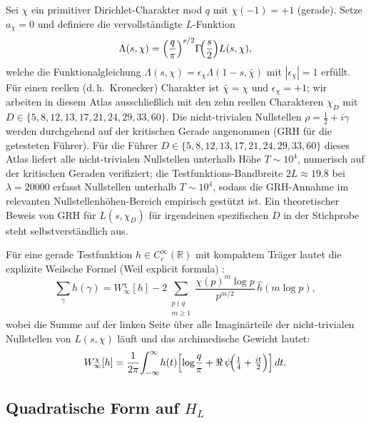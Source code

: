 \documentclass[10pt,twocolumn]{article}
\theoremstyle{definition}
\theoremstyle{remark}
\newcommand{\chifn}{\chi}
\newcommand{\halfline}{\tfrac{1}{2}}
\begin{document}
Sei $\chifn$ ein primitiver Dirichlet-Charakter mod $q$ mit
$\chifn(-1)=+1$ (gerade). Setze $a_{\chifn}=0$ und definiere die vervollständigte
$L$-Funktion
\[
  \Lambda(s,\chifn)
    =\Bigl(\frac{q}{\pi}\Bigr)^{s/2}\Gamma\!\Bigl(\frac{s}{2}\Bigr)
      L(s,\chifn),
\]
welche die Funktionalgleichung
$\Lambda(s,\chifn)=\epsilon_{\chifn}\Lambda(1-s,\bar\chifn)$ mit
$|\epsilon_{\chifn}|=1$ erfüllt. Für einen reellen (d.\,h.\ Kronecker) Charakter
ist $\bar\chifn=\chifn$ und $\epsilon_{\chifn}=+1$; wir arbeiten in diesem Atlas ausschließlich
mit den zehn reellen Charakteren $\chifn_D$ mit $D\in\{5,8,12,13,17,21,
24,29,33,60\}$. Die nicht-trivialen Nullstellen
$\rho=\halfline+i\gamma$ werden durchgehend auf der kritischen Gerade angenommen
(GRH für die getesteten Führer). Für die Führer
$D\in\{5,8,12,13,17,21,24,29,33,60\}$ dieses Atlas liefert
\cite{LMFDB} alle nicht-trivialen Nullstellen unterhalb Höhe
$T\sim 10^4$, numerisch auf der kritischen Geraden verifiziert; die
Testfunktions-Bandbreite $2L\approx 19.8$ bei $\lambda=20000$ erfasst
Nullstellen unterhalb $T\sim 10^4$, sodass die GRH-Annahme im
relevanten Nullstellenhöhen-Bereich empirisch gestützt ist. Ein
theoretischer Beweis von GRH für $L(s,\chifn_D)$ für irgendeinen
spezifischen $D$ in der Stichprobe steht selbstverständlich aus.

Für eine gerade Testfunktion $h\in C_c^\infty(\mathbb{R})$ mit kompaktem Träger
lautet die explizite Weilsche Formel (Weil explicit formula) \cite{IwaniecKowalski}:
\begin{equation}
\label{eq:weil}
  \sum_{\gamma}h(\gamma)
    = W^{\chifn}_\infty[h]
    - 2\sum_{\substack{p\nmid q\\m\geq 1}}
      \frac{\chifn(p)^m\log p}{p^{m/2}}\,\hat h(m\log p),
\end{equation}
wobei die Summe auf der linken Seite über alle Imaginärteile der nicht-trivialen
Nullstellen von $L(s,\chifn)$ läuft und das archimedische Gewicht lautet:
\[
  W^{\chifn}_\infty[h]
    = \frac{1}{2\pi}\!\int_{-\infty}^{\infty}\! h(t)
      \Bigl[\log\!\frac{q}{\pi} + \Re\,\psi\!\Bigl(\tfrac14+\tfrac{it}{2}\Bigr)\Bigr]\,dt.
\]

\subsection{\texorpdfstring{Quadratische Form auf $H_L$}{Quadratische Form auf HL}}
\end{document}
